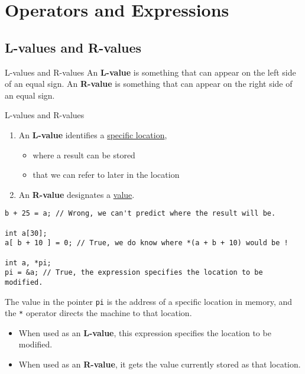 \chapter{Operators and Expressions} %
\label{chap:Operators and Expressions}

\section{L-values and R-values} %
\label{sec:L-values and R-values}
\begin{Definition}[colbacktitle=red!75!black]{L-values and R-values}{}
An \textbf{L-value} is something that can appear on the left side of an equal sign. 
An \textbf{R-value} is something that can appear on the right side of an equal sign. 
\end{Definition}

\begin{Prop}{L-values and R-values}{}
\begin{enumerate}

    \item An \textbf{L-value} identifies a \underline{specific location},
      \begin{itemize}

          \item where a result can be stored 
          \item that we can refer to later in the location

      \end{itemize}
    \item An \textbf{R-value} designates a \underline{value}.
\end{enumerate}
\end{Prop}

\begin{Example}{}{}
\begin{lstlisting}
b + 25 = a; // Wrong, we can't predict where the result will be. 

int a[30]; 
a[ b + 10 ] = 0; // True, we do know where *(a + b + 10) would be !

int a, *pi; 
pi = &a; // True, the expression specifies the location to be modified.
\end{lstlisting}

The value in the pointer \verb|pi| is the address of a specific location in memory, and the \verb|*| operator directs the machine to that location. 
\begin{itemize}

    \item When used as an \textbf{L-value}, this expression specifies the location to be modified.

    \item When used as an \textbf{R-value}, it gets the value currently stored as that location.
\end{itemize}
\end{Example}

